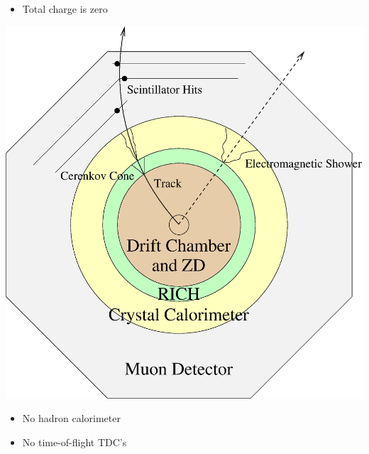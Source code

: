 \begin{slide*}
\begin{minipage}[t]{\linewidth}
\begin{itemize}
  \vspace{-0.5 cm}
  \item Total charge is zero

\end{itemize}

\end{minipage}
\end{slide*}


\begin{slide*}
\slideframe{}
\begin{minipage}[t]{\linewidth}
\huge

\vspace{0.1 cm}

\begin{center}
  \includegraphics[width=0.9\linewidth]{cleo_endview.eps}
\end{center}

\begin{itemize}
  \item No hadron calorimeter
  \item No time-of-flight TDC's
\end{itemize}

\end{minipage}
\end{slide*}

